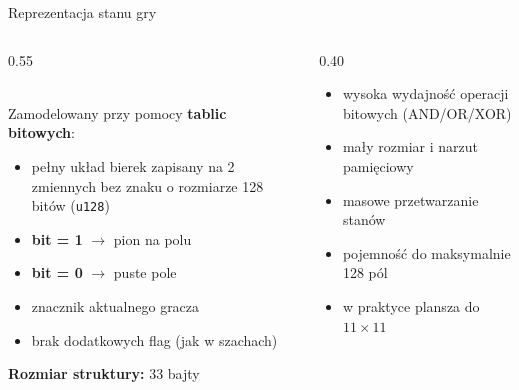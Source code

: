 \documentclass[10pt, aspectratio=169]{beamer}
\begin{document}
\begin{frame}{Reprezentacja stanu gry}

\begin{columns}[T]

\begin{column}{0.55\textwidth}

     \\
    \vspace{0.1cm}
    Zamodelowany przy pomocy \textbf{tablic bitowych}:
    \begin{itemize}
        \item pełny układ bierek zapisany na 2 zmiennych bez znaku o rozmiarze 128 bitów (\texttt{u128})
        \item \textbf{bit = 1} $\rightarrow$ pion na polu
        \item \textbf{bit = 0} $\rightarrow$ puste pole
    \end{itemize}

    \vspace{0.2cm}
    
    \vspace{0.1cm}
    \begin{itemize}
        \item znacznik aktualnego gracza
        \item brak dodatkowych flag (jak w szachach)
    \end{itemize}

    \vspace{0.2cm}
    
    \textbf{Rozmiar struktury:} 33 bajty

\end{column}

\begin{column}{0.40\textwidth}
    
    \vspace{0.1cm}
    \begin{itemize}
        \item wysoka wydajność operacji bitowych (AND/OR/XOR)
        \item mały rozmiar i narzut pamięciowy
        \item masowe przetwarzanie stanów
    \end{itemize}
    
    \vspace{0.5cm}
    
    \vspace{0.1cm}
    \begin{itemize}
        \item pojemność do maksymalnie \\ 128 pól
        \item w praktyce plansza do $11 \times 11$
    \end{itemize}

\end{column}

\end{columns}

\end{frame}
\end{document}
